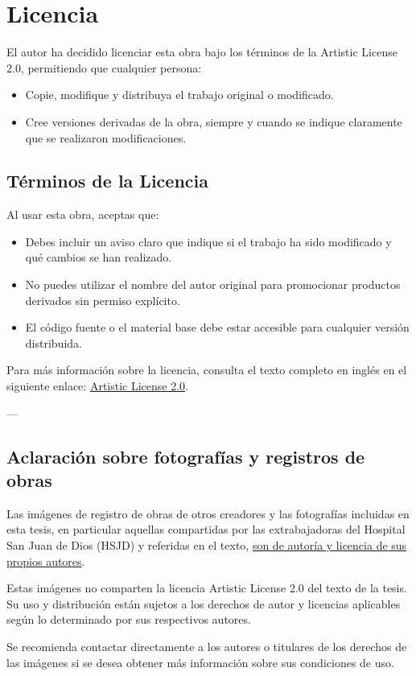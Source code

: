 \section*{Licencia}

El autor ha decidido licenciar esta obra bajo los términos de la Artistic License 2.0, permitiendo que cualquier persona:
\begin{itemize}
    \item Copie, modifique y distribuya el trabajo original o modificado.
    \item Cree versiones derivadas de la obra, siempre y cuando se indique claramente que se realizaron modificaciones.
\end{itemize}

\subsection*{Términos de la Licencia}

Al usar esta obra, aceptas que:

\begin{itemize}
    \item Debes incluir un aviso claro que indique si el trabajo ha sido modificado y qué cambios se han realizado.
    \item No puedes utilizar el nombre del autor original para promocionar productos derivados sin permiso explícito.
    \item El código fuente o el material base debe estar accesible para cualquier versión distribuida.
\end{itemize}

Para más información sobre la licencia, consulta el texto completo en inglés en el siguiente enlace: \href{https://opensource.org/licenses/Artistic-2.0}{Artistic License 2.0}.

---

\subsection*{Aclaración sobre fotografías y registros de obras}

Las imágenes de registro de obras de otros creadores y las fotografías incluidas en esta tesis, en particular aquellas compartidas por las extrabajadoras del Hospital San Juan de Dios (HSJD) y referidas en el texto, \underline{son de autoría y licencia de sus propios autores}.

Estas imágenes no comparten la licencia Artistic License 2.0 del texto de la tesis. Su uso y distribución están sujetos a los derechos de autor y licencias aplicables según lo determinado por sus respectivos autores.

Se recomienda contactar directamente a los autores o titulares de los derechos de las imágenes si se desea obtener más información sobre sus condiciones de uso.
